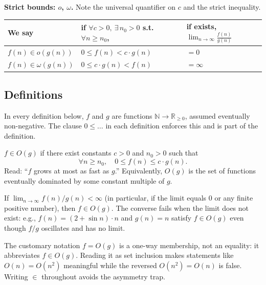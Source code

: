 \medskip
\noindent\textbf{Strict bounds: $o$, $\omega$.} Note the universal quantifier on $c$ and the strict inequality.
\begin{center}
\begin{tabular}{lll}
\toprule
We say               & if $\forall c > 0,\ \exists\, n_0 > 0$ s.t.\ $\forall n \ge n_0$, & if exists, $\displaystyle\lim_{n\to\infty} \frac{f(n)}{g(n)}$ \\
\midrule
$f(n) \in o(g(n))$        & $0 \le f(n) < c \cdot g(n)$                       & $= 0$    \\
$f(n) \in \omega(g(n))$   & $0 \le c \cdot g(n) < f(n)$                       & $= \infty$ \\
\bottomrule
\end{tabular}
\end{center}

\subsection{Definitions}

In every definition below, $f$ and $g$ are functions $\mathbb{N} \to \mathbb{R}_{\ge 0}$, assumed eventually non-negative. The clause $0 \le \dots$ in each definition enforces this and is part of the definition.

\begin{definition}[Big-O]
\label{def:big_o}
$f \in O(g)$ if there exist constants $c > 0$ and $n_0 > 0$ such that
\[
  \forall n \ge n_0,\quad 0 \le f(n) \le c \cdot g(n).
\]
Read: ``$f$ grows at most as fast as $g$.'' Equivalently, $O(g)$ is the set of functions eventually dominated by some constant multiple of $g$.
\end{definition}

\begin{remark}
If $\lim_{n \to \infty} f(n)/g(n) < \infty$ (in particular, if the limit equals $0$ or any finite positive number), then $f \in O(g)$. The converse fails when the limit does not exist: e.g., $f(n) = (2 + \sin n) \cdot n$ and $g(n) = n$ satisfy $f \in O(g)$ even though $f/g$ oscillates and has no limit.
\end{remark}

\begin{remark}[Notation: $\in$ versus $=$]
The customary notation $f = O(g)$ is a one-way membership, not an equality: it abbreviates $f \in O(g)$. Reading it as set inclusion makes statements like $O(n) = O(n^2)$ meaningful while the reversed $O(n^2) = O(n)$ is false. Writing $\in$ throughout avoids the asymmetry trap.
\end{remark}

